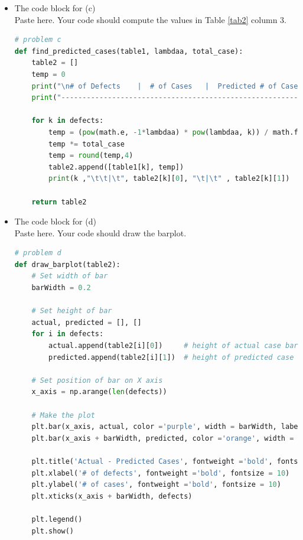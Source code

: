 \documentclass[a4 paper]{article}
\numberwithin{equation}{section}
\newcommand{\0}{\mathbf{0}}
\begin{document}
\begin{itemize}
\begin{lstlisting}[language=Python]
    lambdaa = total_defects/total_case    # Lambda = total number of defects / total number of cases
    print("\nLambda : " ,lambdaa)
    return lambdaa, total_case
        \end{lstlisting}

		\item The code block for (c)\\
		Paste here. Your code should compute the values in Table \ref{tab2} column 3.
		\begin{lstlisting}[language=Python]
# problem c
def find_predicted_cases(table1, lambdaa, total_case):
    table2 = []
    temp = 0
    print("\n# of Defects    |  # of Cases   |  Predicted # of Cases")
    print("--------------------------------------------------------")

    for k in defects:
        temp = (pow(math.e, -1*lambdaa) * pow(lambdaa, k)) / math.factorial(k)  # apply poisson distribution formula
        temp *= total_case
        temp = round(temp,4)
        table2.append([table1[k], temp])
        print(k ,"\t\t|\t", table2[k][0], "\t|\t" , table2[k][1])

    return table2
        \end{lstlisting}

		\item The code block for (d)\\
		Paste here. Your code should draw the barplot.
		\begin{lstlisting}[language=Python]
# problem d
def draw_barplot(table2):
    # Set width of bar
    barWidth = 0.2

    # Set height of bar
    actual, predicted = [], []
    for i in defects:
        actual.append(table2[i][0])     # height of actual case bar
        predicted.append(table2[i][1])  # height of predicted case bar

    # Set position of bar on X axis
    x_axis = np.arange(len(defects))
    
    # Make the plot
    plt.bar(x_axis, actual, color ='purple', width = barWidth, label ='Actual Cases')
    plt.bar(x_axis + barWidth, predicted, color ='orange', width = barWidth, label ='Predicted Cases')

    plt.title('Actual - Predicted Cases', fontweight ='bold', fontsize = 15)
    plt.xlabel('# of defects', fontweight ='bold', fontsize = 10)
    plt.ylabel('# of cases', fontweight ='bold', fontsize = 10)
    plt.xticks(x_axis + barWidth, defects)

    plt.legend()
    plt.show()
        \end{lstlisting}
	\end{itemize}
	
	
	
	
\end{document}
